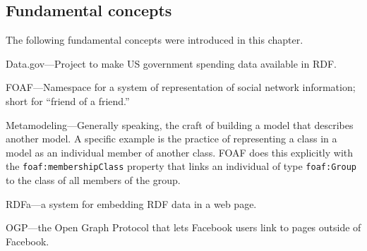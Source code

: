 \subsection{Fundamental concepts}

The following fundamental concepts were introduced in this chapter.

Data.gov---Project to make US government spending data available in RDF.

FOAF---Namespace for a system of representation of social network
information; short for ``friend of a friend.''

Metamodeling---Generally speaking, the craft of building a model that
describes another model. A specific example is the practice of
representing a class in a model as an individual member of another
class. FOAF does this explicitly with the \texttt{foaf:membershipClass} property
that links an individual of type \texttt{foaf:Group} to the class of all members
of the group.

RDFa---a system for embedding RDF data in a web page.

OGP---the Open Graph Protocol that lets Facebook users link to pages
outside of Facebook.
